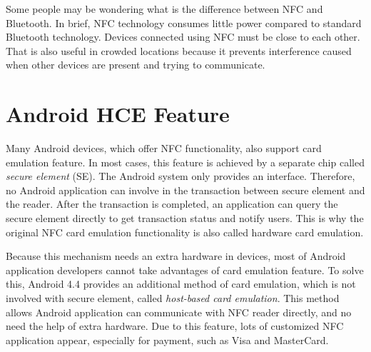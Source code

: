 \begin{CJK}{Bg5}{bsmi}
Some people may be wondering what is the difference between NFC and Bluetooth. In brief, NFC technology consumes little power compared to standard Bluetooth technology\cite{nfc-ble-1}\cite{nfc-ble-2}. Devices connected using NFC must be close to each other. That is also useful in crowded locations because it prevents interference caused when other devices are present and trying to communicate.

\section{Android HCE Feature}

Many Android devices, which offer NFC functionality, also support card emulation feature. In most cases, this feature is achieved by a separate chip called \emph{secure element} (SE). The Android system only provides an interface. Therefore, no Android application can involve in the transaction between secure element and the reader. After the transaction is completed, an application can query the secure element directly to get transaction status and notify users. This is why the original NFC card emulation functionality is also called hardware card emulation.

Because this mechanism needs an extra hardware in devices, most of Android application developers cannot take advantages of card emulation feature. To solve this, Android 4.4 provides an additional method of card emulation, which is not involved with secure element, called \emph{host-based card emulation}. This method allows Android application can communicate with NFC reader directly, and no need the help of extra hardware. Due to this feature, lots of customized NFC application appear, especially for payment, such as Visa and MasterCard\cite{nfc-visa}.

\begin{comment}
\section{OpenID}

OpenID (OID)\cite{openid} is an open standard and decentralized protocol by the non-profit OpenID Foundation that allows users to be authenticated by certain co-operating sites (known as Relying Parties or RP) using a third party service. 

This eliminates the need for webmasters to provide their own ad hoc systems and allowing users to consolidate their digital identities. In other words, users can log into multiple unrelated websites without having to register with their information over and over again. Fig~\ref{fig:openid-flow} is the overview of OpenID protocol and the user flow.
\begin{figure}
\centering
\texttt{[image: picture/openid-flow.png]}
\caption{OpenID overview\cite{openid-flow}}
\label{fig:openid-flow}
\end{figure}
\end{comment}



\end{CJK}
